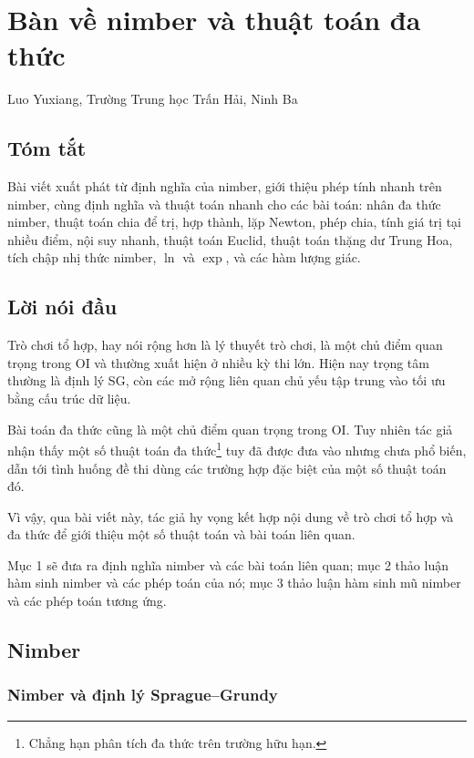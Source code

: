 \documentclass[11pt]{article}
\begin{document}
\section{Bàn về nimber và thuật toán đa thức}

\begin{center}
Luo Yuxiang, Trường Trung học Trấn Hải, Ninh Ba
\end{center}

\subsection*{Tóm tắt}

Bài viết xuất phát từ định nghĩa của nimber, giới thiệu phép tính nhanh trên
nimber, cùng định nghĩa và thuật toán nhanh cho các bài toán: nhân đa thức
nimber, thuật toán chia để trị, hợp thành, lặp Newton, phép chia, tính giá trị
tại nhiều điểm, nội suy nhanh, thuật toán Euclid, thuật toán thặng dư Trung
Hoa, tích chập nhị thức nimber, \(\ln\) và \(\exp\), và các hàm lượng giác.

\subsection*{Lời nói đầu}

Trò chơi tổ hợp, hay nói rộng hơn là lý thuyết trò chơi, là một chủ điểm quan
trọng trong OI và thường xuất hiện ở nhiều kỳ thi lớn. Hiện nay trọng tâm
thường là định lý SG, còn các mở rộng liên quan chủ yếu tập trung vào tối ưu
bằng cấu trúc dữ liệu.

Bài toán đa thức cũng là một chủ điểm quan trọng trong OI. Tuy nhiên tác giả
nhận thấy một số thuật toán đa thức\footnote{Chẳng hạn phân tích đa thức trên
trường hữu hạn.} tuy đã được đưa vào nhưng chưa phổ biến, dẫn tới tình huống
đề thi dùng các trường hợp đặc biệt của một số thuật toán đó.

Vì vậy, qua bài viết này, tác giả hy vọng kết hợp nội dung về trò chơi tổ hợp
và đa thức để giới thiệu một số thuật toán và bài toán liên quan.

Mục 1 sẽ đưa ra định nghĩa nimber và các bài toán liên quan; mục 2 thảo luận
hàm sinh nimber và các phép toán của nó; mục 3 thảo luận hàm sinh mũ nimber và
các phép toán tương ứng.

\subsection{Nimber}

\subsubsection{Nimber và định lý Sprague--Grundy}
\end{document}
